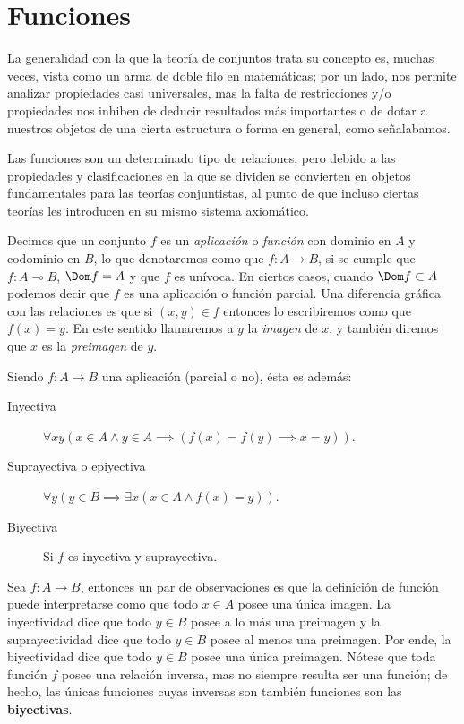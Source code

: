 \documentclass[11pt,a4paper]{book}
\begin{document}
\section{Funciones}
La generalidad con la que la teoría de conjuntos trata su concepto es, muchas veces, vista como un arma de doble filo en matemáticas; por un lado, nos permite analizar propiedades casi universales, mas la falta de restricciones y/o propiedades nos inhiben de deducir resultados más importantes o de dotar a nuestros objetos de una cierta estructura o forma en general, como señalabamos.

Las funciones son un determinado tipo de relaciones, pero debido a las propiedades y clasificaciones en la que se dividen se convierten en objetos fundamentales para las teorías conjuntistas, al punto de que incluso ciertas teorías les introducen en su mismo sistema axiomático.
\begin{mydef}[Función]
	Decimos que un conjunto $f$ es un \textit{aplicación} o \textit{función} con dominio en $A$ y codominio en $B$, lo que denotaremos como que $f:A\rightarrow B$, si se cumple que $f:A\multimap B$, $\Dom f=A$ y que $f$ es unívoca. En ciertos casos, cuando $\Dom f\subset A$ podemos decir que $f$ es una aplicación o función parcial. Una diferencia gráfica con las relaciones es que si $(x,y)\in f$ entonces lo escribiremos como que $f(x)=y$. En este sentido llamaremos a $y$ la \textit{imagen} de $x$, y también diremos que $x$ es la \textit{preimagen} de $y$.

	Siendo $f:A\rightarrow B$ una aplicación (parcial o no), ésta es además:
	\begin{description}
		\item[Inyectiva] $\forall xy(x\in A\wedge y\in A\implies(f(x)=f(y)\implies x=y))$.
		\item[Suprayectiva o epiyectiva] $\forall y(y\in B\implies\exists x(x\in A\wedge f(x)=y))$.
		\item[Biyectiva] Si $f$ es inyectiva y suprayectiva.
	\end{description}
\end{mydef}
Sea $f:A\rightarrow B$, entonces un par de observaciones es que la definición de función puede interpretarse como que todo $x\in A$ posee una única imagen. La inyectividad dice que todo $y\in B$ posee a lo más una preimagen y la suprayectividad dice que todo $y\in B$ posee al menos una preimagen. Por ende, la biyectividad dice que todo $y\in B$ posee una única preimagen. Nótese que toda función $f$ posee una relación inversa, mas no siempre resulta ser una función; de hecho, las únicas funciones cuyas inversas son también funciones son las \textbf{biyectivas}.
\end{document}
